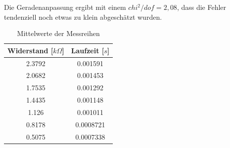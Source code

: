 \documentclass[a4paper]{article}
\begin{document}
	Die Geradenanpassung ergibt mit einem $chi^2/dof = 2,08$, dass die Fehler tendenziell noch etwas zu klein abgeschätzt wurden.
	\begin{table}
		\begin{center}
			\begin{tabular}{|c|c|}
				\hline
				\textbf{Widerstand [$k\Omega$]} & \textbf{Laufzeit [$s$]} \\
				\hline
				2.3792 & 0.001591 \\
				\hline
				2.0682 & 0.001453 \\
				\hline
				1.7535 & 0.001292 \\
				\hline
				1.4435 & 0.001148 \\
				\hline
				1.126 & 0.001011 \\
				\hline
				0.8178 & 0.0008721 \\
				\hline
				0.5075 &  0.0007338 \\
				\hline
			\end{tabular}
		\end{center}
		\caption{Mittelwerte der Messreihen}
	\end{table}
	
\end{document}
